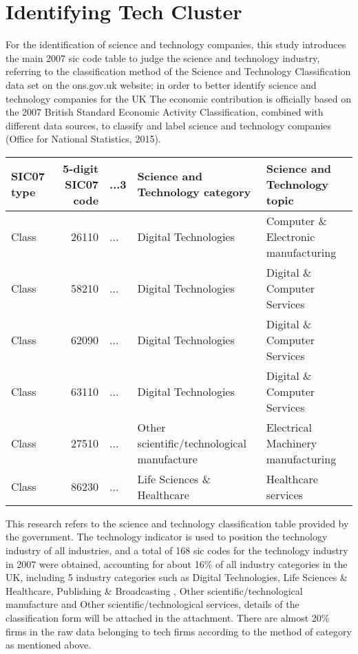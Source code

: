 \documentclass[
  12pt,
  oneside]{book}
\begin{document}
\hypertarget{identifying-tech-cluster}{%
\section{Identifying Tech Cluster}\label{identifying-tech-cluster}}

For the identification of science and technology companies, this study introduces the main 2007 sic code table to judge the science and technology industry, referring to the classification method of the Science and Technology Classification data set on the ons.gov.uk website; in order to better identify science and technology companies for the UK The economic contribution is officially based on the 2007 British Standard Economic Activity Classification, combined with different data sources, to classify and label science and technology companies (Office for National Statistics, 2015).

\begin{table}
\centering
\begin{tabular}{lrlll}
\toprule
\textbf{SIC07 type} & \textbf{5-digit SIC07 code} & \textbf{...3} & \textbf{Science and Technology category} & \textbf{Science and Technology topic}\\
\midrule
Class & 26110 & ... & Digital Technologies & Computer \& Electronic manufacturing\\
Class & 58210 & ... & Digital Technologies & Digital \& Computer Services\\
Class & 62090 & ... & Digital Technologies & Digital \& Computer Services\\
Class & 63110 & ... & Digital Technologies & Digital \& Computer Services\\
Class & 27510 & ... & Other scientific/technological manufacture & Electrical Machinery manufacturing\\
\addlinespace
Class & 86230 & ... & Life Sciences \& Healthcare & Healthcare services\\
\bottomrule
\end{tabular}
\end{table}

This research refers to the science and technology classification table provided by the government. The technology indicator is used to position the technology industry of all industries, and a total of 168 sic codes for the technology industry in 2007 were obtained, accounting for about 16\% of all industry categories in the UK, including 5 industry categories such as Digital Technologies, Life Sciences \& Healthcare, Publishing \& Broadcasting , Other scientific/technological manufacture and Other scientific/technological services, details of the classification form will be attached in the attachment. There are almost 20\% firms in the raw data belonging to tech firms according to the method of category as mentioned above.
\end{document}
